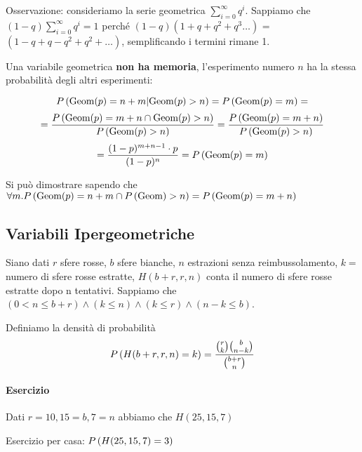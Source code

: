 Osservazione: consideriamo la serie geometrica $ \sum_{i=0}^{\infty} q^i $.
Sappiamo che $ (1-q) \sum_{i=0}^{\infty} q^i = 1 $ perché $ (1-q)(1+q+q^2+q^3\dots) $ = $( 1 - q + q - q^2 + q^2 + \dots )$, semplificando i termini rimane 1.

Una variabile geometrica \textbf{non ha memoria}, l'esperimento numero $ n $ ha la stessa probabilità degli altri esperimenti:

\[ P\left(\text{Geom}(p) = n+m | \text{Geom}(p) > n\right) = P\left(\text{Geom}(p) = m\right)  = \]
\[ = \dfrac{P\left(\text{Geom}(p) = m + n \cap \text{Geom}(p) > n\right)}{P\left(\text{Geom}(p) > n\right)} = \dfrac{P\left(\text{Geom}(p) = m+n\right)}{P\left(\text{Geom}(p) > n\right)}\] 
\[= \dfrac{(1-p)^{m+n-1} \cdot p}{(1-p)^n} = P\left(\text{Geom}(p) = m\right) \]

Si può dimostrare sapendo che $ \forall m . P\left(\text{Geom}(p) = n+m \cap P\left(\text{Geom}\right) > n\right) = P\left(\text{Geom}(p) = m+n\right) $

\subsection{Variabili Ipergeometriche}

Siano dati $ r $ sfere rosse, $ b $ sfere bianche, $ n $ estrazioni senza reimbussolamento, $ k = $ numero di sfere rosse estratte, $ H(b+r, r, n) $ conta il numero di sfere rosse estratte dopo n tentativi. Sappiamo che $ (0 < n \leq b + r) \land (k \leq n)  \land (k \leq r) \land (n-k \leq b) $.

Definiamo la densità di probabilità
\[ P\left(H(b+r, r, n) = k\right) = \dfrac{\binom{r}{k} \binom{b}{n-k}}{\binom{b+r}{n}} \] 

\paragraph{Esercizio} Dati $ r = 10, 15 = b, 7 = n $ abbiamo che $ H(25,15,7) $

Esercizio per casa: $ P\left(H(25, 15, 7) = 3\right) $